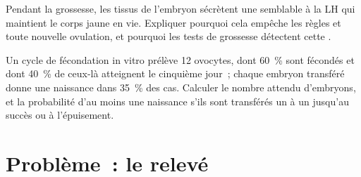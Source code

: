 \begin{exercise}[$\star\star\star$]\label{exo:g11:hormones-and-reproduction:14}
Pendant la grossesse, les tissus de l'embryon sécrètent une 
semblable à la LH qui maintient le corps jaune en vie. Expliquer
pourquoi cela empêche les règles et toute nouvelle ovulation, et
pourquoi les tests de grossesse détectent cette .
\end{exercise}

\begin{exercise}[$\star\star\star$]\label{exo:g11:hormones-and-reproduction:15}
Un cycle de fécondation in vitro prélève 12 ovocytes, dont 60~\% sont
fécondés et dont 40~\% de ceux-là atteignent le cinquième jour~; chaque
embryon transféré donne une naissance dans 35~\% des cas. Calculer le
nombre attendu d'embryons, et la probabilité d'au moins une naissance
s'ils sont transférés un à un jusqu'au succès ou à l'épuisement.
\end{exercise}

\section{Problème~: le relevé}

